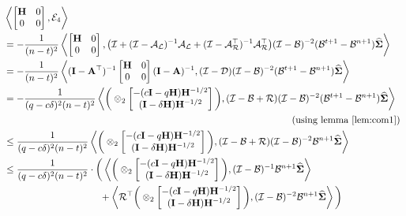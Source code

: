 \begin{align}
\label{eq:e41}
&\iprod{\begin{bmatrix}\H&0\\0&0\end{bmatrix}}{\Y_4}\nonumber\\&=-\frac{1}{(n-t)^2}\iprod{\begin{bmatrix}\H&0\\0&0\end{bmatrix}}{\big(\eyeT + (\eyeT-\AL)^{-1}\AL + (\eyeT-\AR\T)^{-1}\AR\T\big)(\eyeT-\BT)^{-2}(\BT^{t+1}-\BT^{n+1})\Sigh}\nonumber\\
&=-\frac{1}{(n-t)^2}\iprod{(\eye-\A\T)^{-1}\begin{bmatrix}\H&0\\0&0\end{bmatrix}(\eye-\A)^{-1}}{(\eyeT-\DT)(\eyeT-\BT)^{-2}(\BT^{t+1}-\BT^{n+1})\Sigh}\nonumber\\
&=-\frac{1}{(\g-c\delta)^2(n-t)^2}\iprod{\bigg(\otimes_{2}\begin{bmatrix}-(c\eye-\g\Cov)\Cov^{-1/2}\\(\eye-\delta\Cov)\Cov^{-1/2}\end{bmatrix}\bigg)}{(\eyeT-\BT+\RT)(\eyeT-\BT)^{-2}(\BT^{t+1}-\BT^{n+1})\Sigh}\nonumber\\&\qquad\qquad\qquad\qquad\qquad\qquad\qquad\qquad\qquad\qquad\qquad\qquad\qquad\qquad\qquad(\text{using lemma}~\ref{lem:com1})\nonumber\\
&\leq\frac{1}{(\g-c\delta)^2(n-t)^2}\iprod{\bigg(\otimes_{2}\begin{bmatrix}-(c\eye-\g\Cov)\Cov^{-1/2}\\(\eye-\delta\Cov)\Cov^{-1/2}\end{bmatrix}\bigg)}{(\eyeT-\BT+\RT)(\eyeT-\BT)^{-2}\BT^{n+1}\Sigh}\nonumber\\
&\leq\frac{1}{(\g-c\delta)^2(n-t)^2}\cdot\bigg(\iprod{\bigg(\otimes_{2}\begin{bmatrix}-(c\eye-\g\Cov)\Cov^{-1/2}\\(\eye-\delta\Cov)\Cov^{-1/2}\end{bmatrix}\bigg)}{(\eyeT-\BT)^{-1}\BT^{n+1}\Sigh}\nonumber\\&\qquad \qquad\qquad \qquad \qquad  +\iprod{\RT\T\bigg(\otimes_{2}\begin{bmatrix}-(c\eye-\g\Cov)\Cov^{-1/2}\\(\eye-\delta\Cov)\Cov^{-1/2}\end{bmatrix}\bigg)}{(\eyeT-\BT)^{-2}\BT^{n+1}\Sigh}\bigg)\nonumber\\

\end{align}

